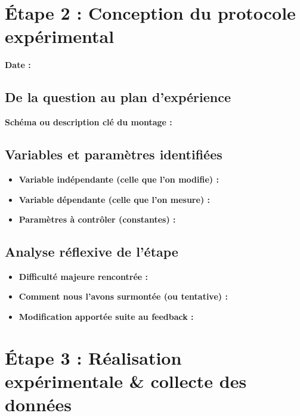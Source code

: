 \documentclass[11pt, a4paper]{article}
\begin{document}
\newpage
\section{Étape 2 : Conception du protocole expérimental}

\medskip

\textbf{Date :} 

\medskip

\subsection{De la question au plan d'expérience}

\textbf{Schéma ou description clé du montage :} \\[0.5cm]

\subsection{Variables et paramètres identifiées}
\begin{itemize}
    \item[$\bullet$] \textbf{Variable indépendante (celle que l'on modifie) :}
    \item[$\bullet$] \textbf{Variable dépendante (celle que l'on mesure) :}
    \item[$\bullet$] \textbf{Paramètres à contrôler (constantes) :}
\end{itemize}

\subsection{Analyse réflexive de l'étape}
\begin{itemize}
    \item[$\bullet$] \textbf{Difficulté majeure rencontrée :}
    \item[$\bullet$] \textbf{Comment nous l'avons surmontée (ou tentative) :}
    \item[$\bullet$] \textbf{Modification apportée suite au feedback :}
\end{itemize}

\newpage
\section{Étape 3 : Réalisation expérimentale \& collecte des données}
\end{document}
